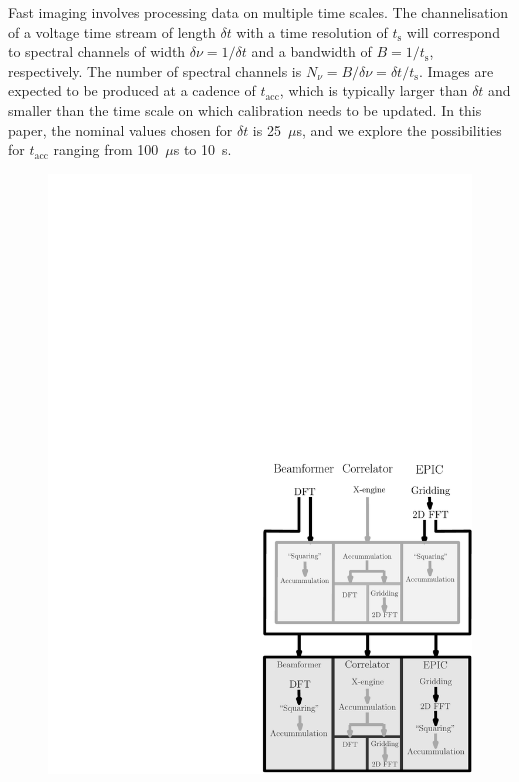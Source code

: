 \documentclass[
  journal=pasa,
  manuscript=article-type,
  year=2020,
  volume=37,
]{cup-journal}
\begin{document}
Fast imaging involves processing data on multiple time scales. The channelisation of a voltage time stream of length $\delta t$ with a time resolution of $t_\textrm{s}$ will correspond to spectral channels of width $\delta\nu=1/\delta t$ and a bandwidth of $B=1/t_\textrm{s}$, respectively. The number of spectral channels is $N_\nu=B/\delta\nu=\delta t/t_\textrm{s}$. Images are expected to be produced at a cadence of $t_\textrm{acc}$, which is typically larger than $\delta t$ and smaller than the time scale on which calibration needs to be updated. In this paper, the nominal values chosen for $\delta t$ is 25~$\mu$s, and we explore the possibilities for $t_\textrm{acc}$ ranging from 100~$\mu$s to 10~s.  

\begin{figure}
\includegraphics[width=\linewidth]{figures/flops_calc_abridged.pdf}
\caption{
\label{fig:hybrid-architectures-cost-schematic}}
\end{figure}
\end{document}
